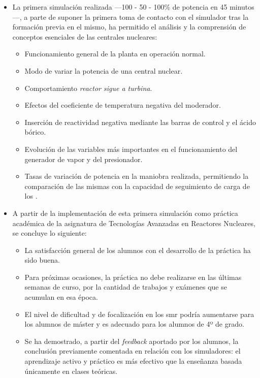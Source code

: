 \begin{itemize}
    \item La primera simulación realizada ---100 - 50 - 100\% de potencia en 45 minutos---, a parte de suponer la primera toma de contacto con el simulador tras la formación previa en el mismo, ha permitido el análisis y la comprensión de conceptos esenciales de las centrales nucleares:
    \begin{itemize}
        \item Funcionamiento general de la planta en operación normal.
        \item Modo de variar la potencia de una central nuclear.
        \item Comportamiento \textit{reactor sigue a turbina}.
        \item Efectos del coeficiente de temperatura negativa del moderador.
        \item Inserción de reactividad negativa mediante las barras de control y el ácido bórico. 
        \item Evolución de las variables más importantes en el funcionamiento del generador de vapor y del presionador.
        \item Tasas de variación de potencia en la maniobra realizada, permitiendo la comparación de las mismas con la capacidad de seguimiento de carga de los .
    \end{itemize}
    \item A partir de la implementación de esta primera simulación como práctica académica de la asignatura de Tecnologías Avanzadas en Reactores Nucleares, se concluye lo siguiente:
    \begin{itemize}
        \item La satisfacción general de los alumnos con el desarrollo de la práctica ha sido buena.
        \item Para próximas ocasiones, la práctica no debe realizarse en las últimas semanas de curso, por la cantidad de trabajos y exámenes que se acumulan en esa época.
        \item El nivel de dificultad y de focalización en los \acrshort{smr} podría aumentarse para los alumnos de máster y es adecuado para los alumnos de 4º de grado.
        \item Se ha demostrado, a partir del \textit{feedback} aportado por los alumnos, la conclusión previamente comentada en relación con los simuladores: el aprendizaje activo y práctico es más efectivo que la enseñanza basada únicamente en clases teóricas.

\end{itemize}
\end{itemize}
